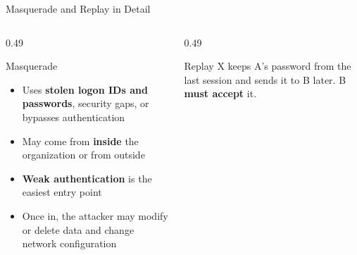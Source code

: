 \documentclass[aspectratio=169,11pt,xcolor={table}]{beamer}
\begin{document}
\begin{frame}{Masquerade and Replay in Detail}
  \begin{columns}[T]
    \begin{column}{0.49\textwidth}
      \begin{block}{Masquerade}
        \small
        \begin{itemize}\setlength{\itemsep}{1pt}
          \item Uses \textbf{stolen logon IDs and passwords}, security gaps, or bypasses authentication
          \item May come from \textbf{inside} the organization or from outside
          \item \textbf{Weak authentication} is the easiest entry point
          \item Once in, the attacker may modify or delete data and change network configuration
        \end{itemize}
      \end{block}
    \end{column}
    \begin{column}{0.49\textwidth}
      \centering
      \begin{block}{Replay}
        \small X keeps A's password from the last session and sends it to B later. B \textbf{must accept} it.
      \end{block}
    \end{column}
  \end{columns}
\end{frame}
\end{document}

